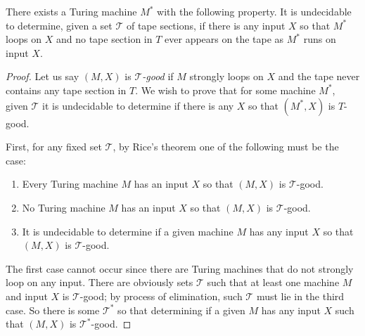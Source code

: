 \documentclass[10pt,a4paper]{amsart}
\newcommand{\Tc}{\mathcal{T}}
\begin{document}
\begin{lemma}\label{lem:bespoke}
There exists a Turing machine $M^*$ with the following property. It is undecidable to determine, given a set $\Tc$ of tape sections, if there is any input $X$ so that $M^*$ loops on $X$ and no tape section in $T$ ever appears on the tape as $M^*$ runs on input $X$.
\end{lemma}

\begin{proof}
Let us say $(M, X)$ is \textit{$\Tc$-good} if $M$ strongly loops on $X$ and the tape never contains any tape section in $T$. We wish to prove that for some machine $M^*$, given $\Tc$ it is undecidable to determine if there is any $X$ so that $(M^*, X)$ is $T$-good.

First, for any fixed set $\Tc$, by Rice's theorem one of the following must be the case:
\begin{enumerate}
    \item Every Turing machine $M$ has an input $X$ so that $(M, X)$ is $\Tc$-good.
    \item No Turing machine $M$ has an input $X$ so that $(M, X)$ is $\Tc$-good.
    \item It is undecidable to determine if a given machine $M$ has any input $X$ so that $(M, X)$ is $\Tc$-good.
\end{enumerate}
The first case cannot occur since there are Turing machines that do not strongly loop on any input. There are obviously sets $\Tc$ such that at least one machine $M$ and input $X$ is $\Tc$-good; by process of elimination, such $\Tc$ must lie in the third case. So there is some $\Tc^*$ so that determining if a given $M$ has any input $X$ such that $(M, X)$ is $\Tc^*$-good.


\end{proof}
\end{document}
